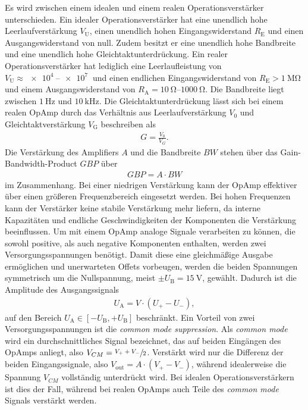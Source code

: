 Es wird zwischen einem idealen und einem realen Operationsverstärker unterschieden.
Ein idealer Operationsverstärker hat eine unendlich hohe Leerlaufverstärkung $V_\text{U}$, einen unendlich hohen Eingangswiderstand $R_\text{E}$ und einen Ausgangswiderstand von null.
Zudem besitzt er eine unendlich hohe Bandbreite und eine unendlich hohe Gleichtaktunterdrückung.
Ein realer Operationsverstärker hat lediglich eine Leerlaufleistung von $V_\text{U}\approx\SIrange{e4}{e7}{}$ und einen endlichen Eingangswiderstand von $R_\text{E}>\SI{1}{\mega\ohm}$ und einem Ausgangswiderstand von $R_\text{A}=\SIrange{10}{1000}{\ohm}$.
Die Bandbreite liegt zwischen $\SI{1}{\hertz}$ und $\SI{10}{\kilo\hertz}$.
Die Gleichtaktunterdrückung lässt sich bei einem realen OpAmp durch das Verhältnis aus Leerlaufverstärkung $V_0$ und Gleichtaktverstärkung $V_\text{G}$ beschreiben als
\begin{align}
    G=\frac{V_0}{V_G}.
\end{align}
Die Verstärkung des Amplifiers $A$ und die Bandbreite $BW$ stehen über das Gain-Bandwidth-Product $GBP$ über
\begin{align}
    GBP=A\cdot BW
\end{align}
im Zusammenhang.
Bei einer niedrigen Verstärkung kann der OpAmp effektiver über einen größeren Frequenzbereich eingesetzt werden.
Bei hohen Frequenzen kann der Verstärker keine stabile Verstärkung mehr liefern, da interne Kapazitäten und endliche Geschwindigkeiten der Komponenten die Verstärkung beeinflussen. \newline
Um mit einem OpAmp analoge Signale verarbeiten zu können, die sowohl positive, als auch negative Komponenten enthalten, werden zwei Versorgungsspannungen benötigt.
Damit diese eine gleichmäßige Ausgabe ermöglichen und unerwarteten Offets vorbeugen, werden die beiden Spannungen symmetrisch um die Nullspannung, meist $\pm U_\text{B}=\SI{15}{\volt}$, gewählt.
Dadurch ist die Amplitude des Ausgangssignals 
\begin{align}
    U_\text{A}=V\cdot(U_+-U_-),
    \label{eq:Amplitude_Ausgangssignal}
\end{align}
auf den Bereich $U_\text{A}\in[-U_\text{B},+U_\text{B}]$ beschränkt.
Ein Vorteil von zwei Versorgungsspannungen ist die \textit{common mode suppression}.
Als \textit{common mode} wird ein durchschnittliches Signal bezeichnet, das auf beiden Eingängen des OpAmps anliegt, also $V_{CM}=\sfrac{V_++V_-}{2}$.
Verstärkt wird nur die Differenz der beiden Eingangssignale, also $V_{\text{out}}=A\cdot(V_+-V_-)$, während idealerweise die Spannung $V_{CM}$ vollständig unterdrückt wird.
Bei idealen Operationsverstärkern ist dies der Fall, während bei realen OpAmps auch Teile des \textit{common mode} Signals verstärkt werden.\newline


